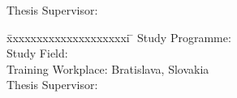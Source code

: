 


Thesis Supervisor: \mySupervisor

\medskip{}
\myDate


\newpage
\thispagestyle{empty}
\mbox{}
\newpage





\begin{tabbing}
    \=xxxxxxxxxxxxxxxxxxxxi \=\kill
    \> Study Programme:     \> \myStudyProgram  \\
    \> Study Field:         \> \myStudyField  \\
    \> Training Workplace:  \> Bratislava, Slovakia \\
    \> Thesis Supervisor:   \> \mySupervisor    
\end{tabbing}
\myDate




\newpage
\thispagestyle{empty}
\mbox{}
\newpage

